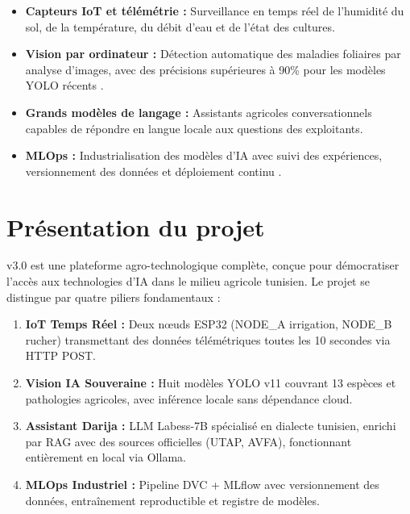 \begin{itemize}
  \item \textbf{Capteurs IoT et télémétrie :} Surveillance en temps réel de l'humidité du
        sol, de la température, du débit d'eau et de l'état des cultures.
  \item \textbf{Vision par ordinateur :} Détection automatique des maladies foliaires par
        analyse d'images, avec des précisions supérieures à 90\% pour les modèles YOLO
        récents \cite{ultralytics2023yolov8}.
  \item \textbf{Grands modèles de langage :} Assistants agricoles conversationnels capables
        de répondre en langue locale aux questions des exploitants.
  \item \textbf{MLOps :} Industrialisation des modèles d'IA avec suivi des expériences,
        versionnement des données et déploiement continu \cite{mlflow2023}.
\end{itemize}

\section{Présentation du projet \farmAI}

\farmAI{} v3.0 est une plateforme agro-technologique complète, conçue pour démocratiser
l'accès aux technologies d'IA dans le milieu agricole tunisien. Le projet se distingue
par quatre piliers fondamentaux :

\begin{tcolorbox}[infobox, title={Les 4 piliers de Smart Farm AI}]
\begin{enumerate}
  \item \textbf{IoT Temps Réel :} Deux nœuds ESP32 (NODE\_A irrigation, NODE\_B rucher)
        transmettant des données télémétriques toutes les 10 secondes via HTTP POST.
  \item \textbf{Vision IA Souveraine :} Huit modèles YOLO v11 couvrant 13 espèces et
        pathologies agricoles, avec inférence locale sans dépendance cloud.
  \item \textbf{Assistant Darija :} LLM Labess-7B spécialisé en dialecte tunisien,
        enrichi par RAG avec des sources officielles (UTAP, AVFA), fonctionnant
        entièrement en local via Ollama.
  \item \textbf{MLOps Industriel :} Pipeline DVC + MLflow avec versionnement des données,
        entraînement reproductible et registre de modèles.
\end{enumerate}
\end{tcolorbox}

